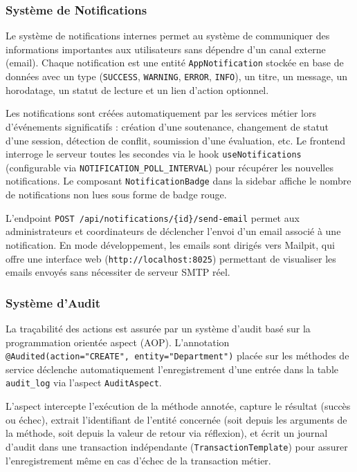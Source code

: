 \subsubsection{Système de Notifications}
\label{ch4:module_notifications}

Le système de notifications internes permet au système de communiquer des informations importantes aux utilisateurs sans dépendre d'un canal externe (email). Chaque notification est une entité \texttt{AppNotification} stockée en base de données avec un type (\texttt{SUCCESS}, \texttt{WARNING}, \texttt{ERROR}, \texttt{INFO}), un titre, un message, un horodatage, un statut de lecture et un lien d'action optionnel.

Les notifications sont créées automatiquement par les services métier lors d'événements significatifs : création d'une soutenance, changement de statut d'une session, détection de conflit, soumission d'une évaluation, etc. Le frontend interroge le serveur toutes les  secondes via le hook \texttt{useNotifications} (configurable via \texttt{NOTIFICATION\_POLL\_INTERVAL}) pour récupérer les nouvelles notifications. Le composant \texttt{NotificationBadge} dans la sidebar affiche le nombre de notifications non lues sous forme de badge rouge.

L'endpoint \texttt{POST /api/notifications/\{id\}/send-email} permet aux administrateurs et coordinateurs de déclencher l'envoi d'un email associé à une notification. En mode développement, les emails sont dirigés vers Mailpit, qui offre une interface web (\texttt{http://localhost:8025}) permettant de visualiser les emails envoyés sans nécessiter de serveur SMTP réel.

\subsubsection{Système d'Audit}
\label{ch4:module_audit}

La traçabilité des actions est assurée par un système d'audit basé sur la programmation orientée aspect (AOP). L'annotation \texttt{@Audited(action="CREATE", entity="Department")} placée sur les méthodes de service déclenche automatiquement l'enregistrement d'une entrée dans la table \texttt{audit\_log} via l'aspect \texttt{AuditAspect}.

L'aspect intercepte l'exécution de la méthode annotée, capture le résultat (succès ou échec), extrait l'identifiant de l'entité concernée (soit depuis les arguments de la méthode, soit depuis la valeur de retour via réflexion), et écrit un journal d'audit dans une transaction indépendante (\texttt{TransactionTemplate}) pour assurer l'enregistrement même en cas d'échec de la transaction métier.


